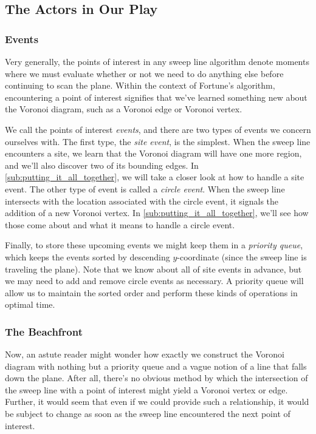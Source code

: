 \documentclass[12pt,twoside]{reedthesis}
\begin{document}
    \subsection{The Actors in Our Play} %
    \label{sub:the_actors_in_our_play}

      \subsubsection{Events} %
      \label{ssub:events}
        Very generally, the points of interest in any sweep line algorithm denote moments where we must evaluate whether or not we need to do anything else before continuing to scan the plane. Within the context of Fortune's algorithm, encountering a point of interest signifies that we've learned something new about the Voronoi diagram, such as a Voronoi edge or Voronoi vertex. \par

        We call the points of interest \emph{events}, and there are two types of events we concern ourselves with. The first type, the \emph{site event}, is the simplest. When the sweep line encounters a site, we learn that the Voronoi diagram will have one more region, and we'll also discover two of its bounding edges. In \cref{sub:putting_it_all_together}, we will take a closer look at how to handle a site event. The other type of event is called a \emph{circle event}. When the sweep line intersects with the location associated with the circle event, it signals the addition of a new Voronoi vertex. In \cref{sub:putting_it_all_together}, we'll see how those come about and what it means to handle a circle event.\par

        Finally, to store these upcoming events we might keep them in a \emph{priority queue}, which keeps the events sorted by descending $y$-coordinate (since the sweep line is traveling  the plane). Note that we know about all of site events in advance, but we may need to add and remove circle events as necessary. A priority queue will allow us to maintain the sorted order and perform these kinds of operations in optimal time. 

      \subsubsection{The Beachfront} %
      \label{ssub:the_beachfront}
        Now, an astute reader might wonder how exactly we construct the Voronoi diagram with nothing but a priority queue and a vague notion of a line that falls down the plane. After all, there's no obvious method by which the intersection of the sweep line with a point of interest might yield a Voronoi vertex or edge. Further, it would seem that even if we could provide such a relationship, it would be subject to change as soon as the sweep line encountered the next point of interest. \par
\end{document}
